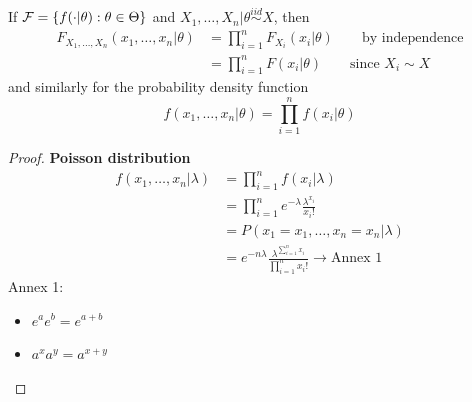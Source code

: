 If $\mathcal{F} = \{f(\cdot|\theta):\theta\in\Theta\}$ and $X_1,\ldots,X_n|\theta\overset{iid}{\sim} X$, then
\begin{equation*}
    \begin{split}
        F_{X_1,\ldots,X_n}(x_1,\ldots,x_n|\theta) & =\prod_{i=1}^{n}F_{X_i}(x_i|\theta)\qquad\text{by independence}\\
        & = \prod_{i=1}^{n}F(x_i|\theta)\qquad\text{since }X_i\sim X 
    \end{split}
\end{equation*}
and similarly for the probability density function
\begin{equation*}
    f(x_1,\ldots,x_n|\theta)=\prod_{i=1}^{n}f(x_i|\theta)
\end{equation*}
\begin{proof}
    \textbf{Poisson distribution}
    \begin{equation*}
        \begin{split}
            f(x_1,\ldots,x_n|\lambda) & = \prod_{i=1}^{n}f(x_i|\lambda)\\
            & = \prod_{i=1}^{n} e^{-\lambda}\frac{\lambda^{x_i}}{x_i!}\\
            & = P(x_1 = x_1,\ldots,x_n = x_n|\lambda)\\
            & = e^{-n\lambda}\frac{\lambda^{\sum_{i=1}^{n}x_i}}{\prod_{i=1}^{n}x_i!}\to\text{Annex 1}
        \end{split}
    \end{equation*}
    Annex 1: 
    \begin{itemize}
        \item $e^a e^b = e^{a+b}$
        \item $a^x a^y = a^{x+y}$
    \end{itemize}
\end{proof}

